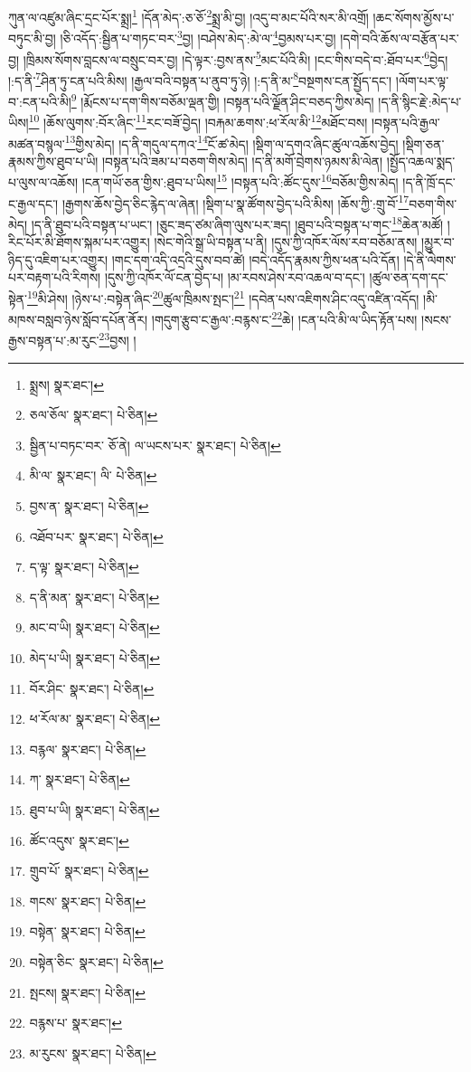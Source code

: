 ཀུན་ལ་འཛུམ་ཞིང་དྲང་པོར་སྨྲ།\footnote{སྨྲས།  སྣར་ཐང་། } །དོན་མེད་:ཅ་ཅོ་\footnote{ཅལ་ཅོལ་  སྣར་ཐང་།  པེ་ཅིན། }སྨྲ་མི་བྱ། །འདུ་བ་མང་པོའི་སར་མི་འགྲོ། །ཆང་སོགས་མྱོས་པ་བཏུང་མི་བྱ། །ཅི་འདོད་:སྦྱིན་པ་གཏང་བར་\footnote{སྦྱིན་པ་བཏང་བར་  ཅོ་ནེ། ལ་ཡངས་པར་  སྣར་ཐང་།  པེ་ཅིན། }བྱ། །བཤེས་མེད་:མེ་ལ་\footnote{མི་ལ་  སྣར་ཐང་། ལི་  པེ་ཅིན། }བྱམས་པར་བྱ། །དགེ་བའི་ཆོས་ལ་བརྩོན་པར་བྱ། །ཁྲིམས་སོགས་བླངས་ལ་བསྲུང་བར་བྱ། །དེ་ལྟར་:བྱས་ནས་\footnote{བྱས་ན་  སྣར་ཐང་།  པེ་ཅིན། }མང་པོའི་མི། །ངང་གིས་བདེ་བ་:ཐོབ་པར་\footnote{འཐོབ་པར་  སྣར་ཐང་།  པེ་ཅིན། }བྱེད། །:ད་ནི་\footnote{ད་ལྟ་  སྣར་ཐང་།  པེ་ཅིན། }ཤིན་ཏུ་ངན་པའི་མིས། །རྒྱལ་བའི་བསྟན་པ་ནུབ་ཏུ་ཉེ། །:ད་ནི་མ་\footnote{ད་ནི་མན་  སྣར་ཐང་།  པེ་ཅིན། }བསྔགས་ངན་སྤྱོད་དང་། །ལོག་པར་ལྟ་བ་:ངན་པའི་མི།\footnote{མང་བ་ཡི།  སྣར་ཐང་།  པེ་ཅིན། } །རྨོངས་པ་དག་གིས་བཅོམ་ལྡན་གྱི། །བསྟན་པའི་ལྗོན་ཤིང་བཅད་ཀྱིས་མེད། །ད་ནི་སྙིང་རྗེ་:མེད་པ་ཡིས།\footnote{མེད་པ་ཡི།  སྣར་ཐང་།  པེ་ཅིན། } །ཆོས་ལུགས་:བོར་ཞིང་\footnote{བོར་ཤིང་  སྣར་ཐང་།  པེ་ཅིན། }རང་བཟོ་བྱེད། །བརྐམ་ཆགས་:ཕ་རོལ་མི་\footnote{ཕ་རོལ་མ་  སྣར་ཐང་།  པེ་ཅིན། }མཐོང་བས། །བསྟན་པའི་རྒྱལ་མཚན་བསྙལ་\footnote{བརྙལ་  སྣར་ཐང་།  པེ་ཅིན། }གྱིས་མེད། །ད་ནི་གདུལ་དཀའ་\footnote{ཀ་  སྣར་ཐང་།  པེ་ཅིན། }ངོ་ཚ་མེད། །སྡིག་ལ་དགའ་ཞིང་ཚུལ་འཆོས་བྱེད། །སྡིག་ཅན་རྣམས་ཀྱིས་ཐུབ་པ་ཡི། །བསྟན་པའི་ཟམ་པ་བཅག་གིས་མེད། །ད་ནི་མགོ་བྲེགས་ཉམས་མི་ལེན། །སྤྱོད་འཆལ་སྨད་པ་ལུས་ལ་འཆོས། །ངན་གཡོ་ཅན་གྱིས་:ཐུབ་པ་ཡིས།\footnote{ཐུབ་པ་ཡི།  སྣར་ཐང་།  པེ་ཅིན། } །བསྟན་པའི་:ཚོང་དུས་\footnote{ཚོང་འདུས་  སྣར་ཐང་། }བཅོམ་གྱིས་མེད། །ད་ནི་ཁྲོ་དང་ང་རྒྱལ་དང་། །རྒྱགས་ཆོས་བྱེད་ཅིང་རྙེད་ལ་ཞེན། །སྡིག་པ་སྣ་ཚོགས་བྱེད་པའི་མིས། །ཆོས་ཀྱི་:གྲུ་བོ་\footnote{གྲུབ་པོ་  སྣར་ཐང་།  པེ་ཅིན། }བཅག་གིས་མེད། །ད་ནི་ཐུབ་པའི་བསྟན་པ་ཡང་། །ཅུང་ཟད་ཙམ་ཞིག་ལུས་པར་ཟད། །ཐུབ་པའི་བསྟན་པ་གང་\footnote{གངས་  སྣར་ཐང་།  པེ་ཅིན། }ཆེན་མཚོ། །རིང་པོར་མི་ཐོགས་སྐམ་པར་འགྱུར། །སེང་གེའི་སྒྲ་ཡི་བསྟན་པ་ནི། །དུས་ཀྱི་འཁོར་ལོས་རབ་བཅོམ་ནས། །མྱུར་བ་ཉིད་དུ་འཇིག་པར་འགྱུར། །གང་དག་འདི་འདྲའི་དུས་བབ་ཚེ། །བདེ་འདོད་རྣམས་ཀྱིས་ཕན་པའི་དོན། །དེ་ནི་ལེགས་པར་བརྟག་པའི་རིགས། །དུས་ཀྱི་འཁོར་ལོ་ངན་བྱེད་པ། །མ་རབས་ཤེས་རབ་འཆལ་བ་དང་། །ཚུལ་ཅན་དག་དང་སྟེན་\footnote{བསྟེན་  སྣར་ཐང་།  པེ་ཅིན། }མི་ཤེས། །ཉེས་པ་:བསྟེན་ཞིང་\footnote{བསྟེན་ཅིང་  སྣར་ཐང་།  པེ་ཅིན། }ཚུལ་ཁྲིམས་སྤང་།\footnote{སྤངས།  སྣར་ཐང་།  པེ་ཅིན། } །དབེན་པས་འཇིགས་ཤིང་འདུ་འཛིན་འདོད། །མི་མཁས་བསླབ་ཉེས་སློབ་དཔོན་ནོར། །གདུག་རྩུབ་ང་རྒྱལ་:བརྙས་ང་\footnote{བརྙས་པ་  སྣར་ཐང་། }ཆེ། །ངན་པའི་མི་ལ་ཡིད་རྟོན་པས། །སངས་རྒྱས་བསྟན་པ་:མ་རུང་\footnote{མ་རུངས་  སྣར་ཐང་།  པེ་ཅིན། }བྱས། །
